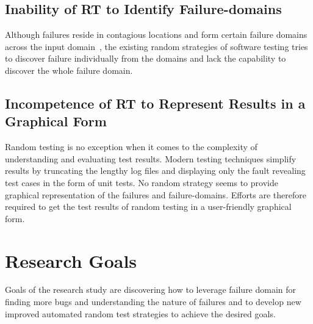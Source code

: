 \subsection{Inability of RT to Identify Failure-domains}
Although failures reside in contagious locations and form certain failure domains across the input domain~\cite{chan1996proportional}, the existing random strategies of software testing tries to discover failure individually from the domains and lack the capability to discover the whole failure domain.


\subsection{Incompetence of RT to Represent Results in a Graphical Form}
Random testing is no exception when it comes to the complexity of understanding and evaluating test results. Modern testing techniques simplify results by truncating the lengthy log files and displaying only the fault revealing test cases in the form of unit tests. No random strategy seems to provide graphical representation of the failures and failure-domains. Efforts are therefore required to get the test results of random testing in a user-friendly graphical form. 


\section{Research Goals}\label{ResearchGoals_1}
Goals of the research study are discovering how to leverage failure domain for finding more bugs and understanding the nature of failures and to develop new improved automated random test strategies to achieve the desired goals.




